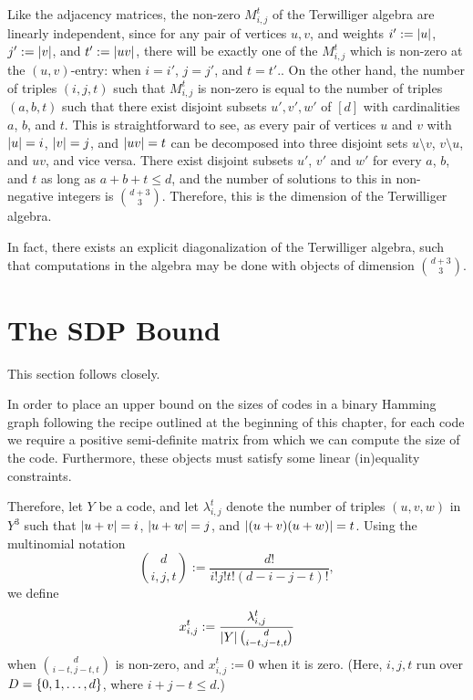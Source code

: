 \documentclass{report}
\newcommand{\wt}[1]{\abs{ #1 }}
\newcommand{\lijt}{\lambda_{i, j}^t}
\newcommand{\xijt}{x_{i, j}^t}
\newcommand{\Mijt}{M_{i, j}^t}
\begin{document}
    Like the adjacency matrices, the non-zero $\Mijt$ of the Terwilliger algebra
    are linearly independent, since for any pair of vertices $u, v$, and weights
    $i' := \wt{u}$, $j' := \wt{v}$, and $t' := \wt{uv}$, there will be exactly
    one of the $\Mijt$ which is non-zero at the $(u, v)$-entry: when $i = i'$,
    $j = j'$, and $t = t'$..  On the other hand, the number of triples $(i, j,
    t)$ such that $\Mijt$ is non-zero is equal to the number of triples $(a, b,
    t)$ such that there exist disjoint subsets $u', v', w'$ of $[d]$ with
    cardinalities $a$, $b$, and $t$.  This is straightforward to see, as every
    pair of vertices $u$ and $v$ with $\wt{u} = i$, $\wt{v} = j$, and $\wt{uv} =
    t$ can be decomposed into three disjoint sets $u \setminus v$, $v \setminus
    u$, and $uv$, and vice versa.  There exist disjoint subsets $u'$, $v'$ and
    $w'$ for every $a$, $b$, and $t$ as long as $a + b + t \leq d$, and the
    number of solutions to this in non-negative integers is $\binom{d+3}{3}$.
    Therefore, this is the dimension of the Terwilliger algebra.

    In fact, there exists an explicit diagonalization of the Terwilliger
    algebra, such that computations in the algebra may be done with objects of
    dimension $\binom{d+3}{3}$.

  \FloatBarrier
  \section{The SDP Bound}\label{sec:SDP-bound:SDP-bound}

    This section follows \cite[Subsection I. B]{schrijver} closely.

    In order to place an upper bound on the sizes of codes in a binary Hamming
    graph following the recipe outlined at the beginning of this chapter, for
    each code we require a positive semi-definite matrix from which we can
    compute the size of the code.  Furthermore, these objects must satisfy some
    linear (in)equality constraints.

    Therefore, let $Y$ be a code, and let $\lijt$ denote the number of triples
    $(u, v, w)$ in $Y^3$ such that $\wt{u + v} = i$, $\wt{u + w} = j$, and
    $\wt{(u+v)(u+w)} = t$.  Using the multinomial notation
    $$
      \binom{d}{i, j, t} := \frac{d!}{i! j! t! (d - i - j - t)!},
    $$
    we define
    \begin{equation}
      \xijt := \frac{\lijt}{\abs{Y} \binom{d}{i - t, j - t, t}}
    \end{equation}
    when $\binom{d}{i-t, j-t, t}$ is non-zero, and $\xijt := 0$ when it is zero.
    (Here, $i, j, t$ run over $D = \left\lbrace 0, 1, \ldots, d \right\rbrace$, where $i + j - t \leq
    d$.)
\end{document}
